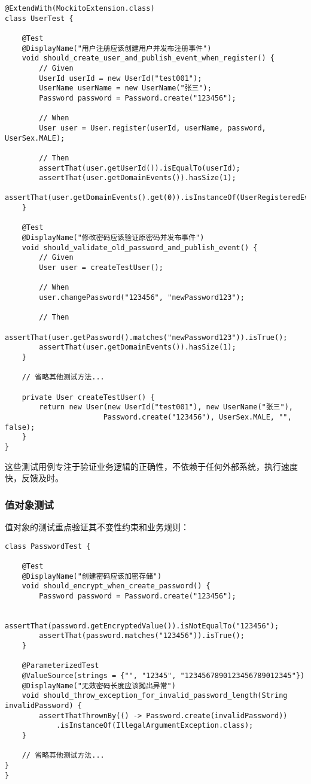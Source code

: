 \documentclass[a4paper,12pt]{article}
\begin{document}
\begin{lstlisting}[caption=用户聚合根测试]
@ExtendWith(MockitoExtension.class)
class UserTest {
    
    @Test
    @DisplayName("用户注册应该创建用户并发布注册事件")
    void should_create_user_and_publish_event_when_register() {
        // Given
        UserId userId = new UserId("test001");
        UserName userName = new UserName("张三");
        Password password = Password.create("123456");
        
        // When
        User user = User.register(userId, userName, password, UserSex.MALE);
        
        // Then
        assertThat(user.getUserId()).isEqualTo(userId);
        assertThat(user.getDomainEvents()).hasSize(1);
        assertThat(user.getDomainEvents().get(0)).isInstanceOf(UserRegisteredEvent.class);
    }
    
    @Test
    @DisplayName("修改密码应该验证原密码并发布事件")
    void should_validate_old_password_and_publish_event() {
        // Given
        User user = createTestUser();
        
        // When
        user.changePassword("123456", "newPassword123");
        
        // Then
        assertThat(user.getPassword().matches("newPassword123")).isTrue();
        assertThat(user.getDomainEvents()).hasSize(1);
    }
    
    // 省略其他测试方法...
    
    private User createTestUser() {
        return new User(new UserId("test001"), new UserName("张三"), 
                       Password.create("123456"), UserSex.MALE, "", false);
    }
}
\end{lstlisting}

这些测试用例专注于验证业务逻辑的正确性，不依赖于任何外部系统，执行速度快，反馈及时。

\subsubsection{值对象测试}

值对象的测试重点验证其不变性约束和业务规则：

\begin{lstlisting}[caption=Password值对象测试]
class PasswordTest {
    
    @Test
    @DisplayName("创建密码应该加密存储")
    void should_encrypt_when_create_password() {
        Password password = Password.create("123456");
        
        assertThat(password.getEncryptedValue()).isNotEqualTo("123456");
        assertThat(password.matches("123456")).isTrue();
    }
    
    @ParameterizedTest
    @ValueSource(strings = {"", "12345", "1234567890123456789012345"})
    @DisplayName("无效密码长度应该抛出异常")
    void should_throw_exception_for_invalid_password_length(String invalidPassword) {
        assertThatThrownBy(() -> Password.create(invalidPassword))
            .isInstanceOf(IllegalArgumentException.class);
    }
    
    // 省略其他测试方法...
}
}
\end{lstlisting}
\end{document}
